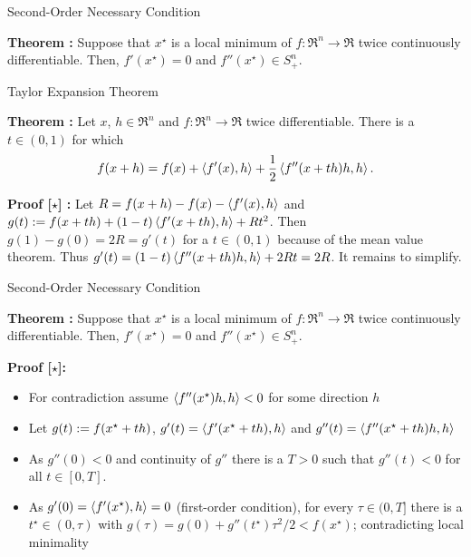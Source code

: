 \documentclass[9pt]{beamer}
\begin{document}
\begin{frame}{Second-Order Necessary Condition}

  \textbf{Theorem : } Suppose that $x^\star$ is a local minimum of $f:\Re^n\to\Re$ twice continuously differentiable. Then, $f'(x^\star)=0$ and $f''(x^\star)\in S^n_{+}$.
  
\end{frame}

\begin{frame}{Taylor Expansion Theorem}

  \textbf{Theorem : } Let $x$, $h\in \Re^n$ and $f:\Re^n\to\Re$ twice differentiable. There is a $t\in (0, 1)$ for which
  \[
    f(x+h) = f(x) + \left<f'(x), h\right> + \frac12 \left<f''(x+th) h, h\right>.
  \]

  \vfill
  
  \textbf{Proof [$\star$] : } Let $R=f(x+h)-f(x)-\left<f'(x), h\right>$ and $g(t) := f(x+t h)+(1-t)\left<f'(x+t h), h\right> + Rt^2$. Then $g(1)-g(0)=2R=g'(t)$ for a $t\in (0, 1)$ because of the mean value theorem. Thus $g'(t) = (1-t)\left<f''(x+th)h, h\right> + 2 R t = 2R$. It remains to simplify.

\end{frame}

\begin{frame}{Second-Order Necessary Condition}

  \textbf{Theorem : } Suppose that $x^\star$ is a local minimum of $f:\Re^n\to\Re$ twice continuously differentiable. Then, $f'(x^\star)=0$ and $f''(x^\star)\in S^n_{+}$.

  \vfill
  
  \textbf{Proof [$\star$]:}
  \begin{itemize}
  \item For contradiction assume $\left<f''(x^\star) h, h\right> < 0$ for some direction $h$
  \item<2-> Let $g(t) := f(x^\star+t h)$, $g'(t) = \left<f'(x^\star+t h), h\right>$ and $g''(t) = \left<f''(x^\star+t h) h, h\right>$
  \item<3-> As $g''(0)<0$ and continuity of $g''$ there is a $T>0$ such that $g''(t)<0$ for all $t\in [0, T]$.
  \item<4-> As $g'(0)=\left<f'(x^\star), h\right>=0$ (first-order condition), for every $\tau\in(0, T]$ there is a $t^\star\in(0, \tau)$ with $g(\tau)= g(0) + g''(t^\star) \tau^2/2 < f(x^\star)$; contradicting local minimality
  \end{itemize}
  
\end{frame}
\end{document}
